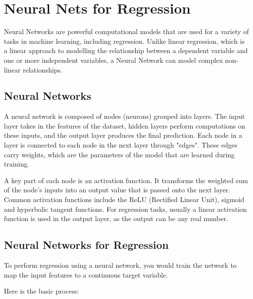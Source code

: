 \chapter{Neural Nets for Regression}

Neural Networks are powerful computational models that are used for a variety of tasks in machine learning, including regression. Unlike linear regression, which is a linear approach to modelling the relationship between a dependent variable and one or more independent variables, a Neural Network can model complex non-linear relationships.

\section{Neural Networks}
A neural network is composed of nodes (neurons) grouped into layers. The input layer takes in the features of the dataset, hidden layers perform computations on these inputs, and the output layer produces the final prediction. Each node in a layer is connected to each node in the next layer through "edges". These edges carry weights, which are the parameters of the model that are learned during training.

A key part of each node is an activation function. It transforms the weighted sum of the node's inputs into an output value that is passed onto the next layer. Common activation functions include the ReLU (Rectified Linear Unit), sigmoid and hyperbolic tangent functions. For regression tasks, usually a linear activation function is used in the output layer, as the output can be any real number.

\section{Neural Networks for Regression}
To perform regression using a neural network, you would train the network to map the input features to a continuous target variable.

Here is the basic process:

